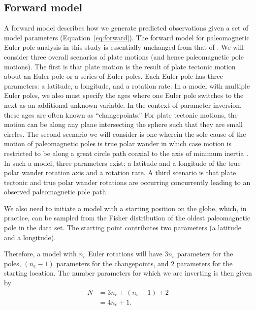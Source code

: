 \documentclass[]{agujournal2019}
\begin{document}
\subsection*{Forward model}
\label{sec:forward_model}
A forward model describes how we generate predicted observations given a set of model parameters (Equation~\ref{eq:forward}). The forward model for paleomagnetic Euler pole analysis in this study is essentially unchanged from that of . We will consider three overall scenarios of plate motions (and hence paleomagnetic pole motions). The first is that plate motion is the result of plate tectonic motion about an Euler pole or a series of Euler poles. Each Euler pole has three parameters: a latitude, a longitude, and a rotation rate. In a model with multiple Euler poles, we also must specify the ages where one Euler pole switches to the next as an additional unknown variable. In the context of parameter inversion, these ages are often known as ``changepoints.'' For plate tectonic motions, the motion can be along any plane intersecting the sphere such that they are small circles. The second scenario we will consider is one wherein the sole cause of the motion of paleomagnetic poles is true polar wander in which case motion is restricted to be along a great circle path coaxial to the axis of minimum inertia \cite{Creveling2012a}. In such a model, three parameters exist: a latitude and a longitude of the true polar wander rotation axis and a rotation rate.  A third scenario is that plate tectonic and true polar wander rotations are occurring concurrently leading to an observed paleomagnetic pole path. 

We also need to initiate a model with a starting position on the globe, which, in practice, can be sampled from the Fisher distribution of the oldest paleomagnetic pole in the data set. The starting point contributes two parameters (a latitude and a longitude). 

Therefore, a model with $n_e$ Euler rotations will have $3 n_e$ parameters for the poles, $(n_e-1)$ parameters for the changepoints, and 2 parameters for the starting location. The number parameters for which we are inverting is then given by
\begin{equation}
\begin{aligned}
N &= 3 n_e + (n_e -1) + 2 \\
 &= 4 n_e + 1.
\end{aligned}
\label{eq:n_parameters}
\end{equation}
\end{document}
